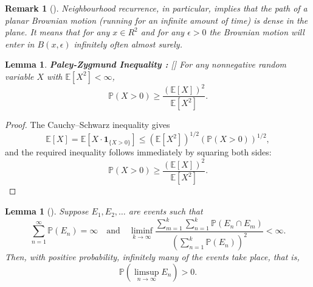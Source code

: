 \documentclass{article}
\numberwithin{equation}{section}
\newtheorem{lemma}[theorem]{Lemma}
\newtheorem{remark}[theorem]{Remark}
\begin{document}
\begin{remark}[{\cite[Remark 3.21]{PeresMortersBook}}]
\textit{Neighbourhood recurrence}, in particular, implies that the path of a planar Brownian motion (running for an infinite amount of time) is dense in the plane. It means that for any \(x \in R^2\) and for any \( \epsilon > 0\) the Brownian motion will enter in \(B(x,\epsilon)\) infinitely often almost surely.
\end{remark}
\begin{lemma}
\textbf{Paley-Zygmund Inequality : } [{\cite[Lemma 3.23]{PeresMortersBook}}]
For any nonnegative random variable \( X \) with \( \mathbb{E}[X^2] < \infty \),
\[
\mathbb{P}(X > 0) \geq \frac{(\mathbb{E}[X])^2}{\mathbb{E}[X^2]}.
\]
\end{lemma}
\begin{proof}
The Cauchy–Schwarz inequality gives
\[
\mathbb{E}[X] = \mathbb{E}[X \cdot \mathbf{1}_{\{X > 0\}}] \leq \left(\mathbb{E}[X^2]\right)^{1/2} \left(\mathbb{P}(X > 0)\right)^{1/2},
\]
and the required inequality follows immediately by squaring both sides:
\[
\mathbb{P}(X > 0) \geq \frac{(\mathbb{E}[X])^2}{\mathbb{E}[X^2]}.
\]
\end{proof}
\begin{lemma}[{\cite[Lemma 3.24]{PeresMortersBook}}]
Suppose \( E_1, E_2, \ldots \) are events such that
\[
\sum_{n=1}^\infty \mathbb{P}(E_n) = \infty
\quad \text{and} \quad
\liminf_{k \to \infty} \frac{\sum_{m=1}^k \sum_{n=1}^k \mathbb{P}(E_n \cap E_m)}{\left( \sum_{n=1}^k \mathbb{P}(E_n) \right)^2} < \infty.
\]
Then, with positive probability, infinitely many of the events take place, that is,
\[
\mathbb{P} \left( \limsup_{n \to \infty} E_n \right) > 0.
\]
\end{lemma}





\end{document}
